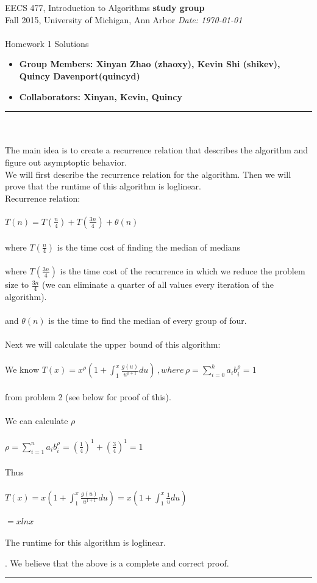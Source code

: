 \documentclass[tikz]{article}
\newcommand{\shortbar}{\begin{center}\rule{5ex}{0.1pt}\end{center}}
\newcommand{\courseNumber}{EECS 477}
\newcommand{\courseTitle}{Introduction to Algorithms}
\newcommand{\semester}{Fall  2015}
\theoremstyle{plain}
\theoremstyle{definition}
\theoremstyle{remark}
\newenvironment{solution}[1]{\medskip\noindent{\bf Problem #1.~}}{\shortbar}
\newcommand{\solutions}[5]{
\vspace{-2ex}
\begin{center}
{\courseNumber, \courseTitle
\hfill {\bf\Large {#1}}\\
\semester, University of Michigan, Ann Arbor \hfill
{\em Date: #4}}\\
\vspace{-1ex}
\hrulefill\\
\vspace{4ex}
{\LARGE Homework {#3} Solutions}\\
\vspace{2ex}
\end{center}
\begin{itemize}
\item {\bf \Large Group Members: {#2}}
\item {\bf \Large Collaborators: {#5}}
\end{itemize}
\noindent
\shortbar
\vspace{3ex}
}
\begin{document}
\solutions{study group}{Xinyan Zhao (zhaoxy), Kevin Shi (shikev), Quincy Davenport(quincyd)}{1}{\today}{Xinyan, Kevin, Quincy}
%
%
\begin{solution}{1}\\\\
The main idea is to create a recurrence relation that describes the algorithm and figure out asymptoptic behavior.\\
We will first describe the recurrence relation for the algorithm. Then we will prove that the runtime of this algorithm is loglinear.\\
Recurrence relation:\\\\
$T(n) = T(\frac{n}{4}) + T(\frac{3n}{4}) + \theta(n)$\\\\
where $T(\frac{n}{4})$ is the time cost of finding the median of medians\\\\
where $T(\frac{3n}{4})$ is the time cost of the recurrence in which we reduce the problem size to $\frac{3n}{4}$ (we can
eliminate a quarter of all values every iteration of the algorithm).\\\\
and $\theta(n)$ is the time to find the median of every group of four.\\
\\
Next we will calculate the upper bound of this algorithm:\\
\\
We know $T(x) = x^{\rho}(1 + \int_{1}^{x} \frac{g(u)}{u^{\rho + 1}}du) \, ,where \, \rho = \sum_{i=0}^{k} a_ib_i^{\rho} = 1$\\
\\
from problem 2 (see below for proof of this).\\
\\
We can calculate $\rho$\\
\\
$\rho = \sum_{i=1}^{n} a_ib_i^{\rho} = (\frac{1}{4})^1 + (\frac{3}{4})^1 = 1$\\
\\
Thus\\
\\
$T(x) = x(1 + \int_{1}^{x} \frac{g(u)}{u^{1 + 1}}du) = x(1 + \int_{1}^{x} \frac{1}{u}du)$\\
\\
$=xlnx$\\
\\
The runtime for this algorithm is loglinear. 


\medskip
{}. We believe that the above is a complete and correct proof.
\end{solution}
\end{document}
